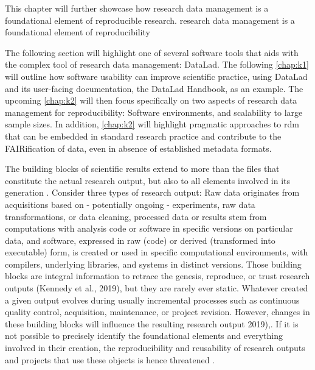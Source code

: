 This chapter will further showcase how research data management is a foundational element of reproducible research.
research data management is a foundational element of reproducibility \citep{borghi2021promoting}


The following section will  highlight one of several software tools that aids with the complex tool of research data management: DataLad. The following \cref{chap:k1} will outline how software usability can improve scientific practice, using DataLad and its user-facing documentation, the DataLad Handbook, as an example.
The upcoming \cref{chap:k2} will then focus specifically on two aspects of research data management for reproducibility: Software environments, and scalability to large sample sizes.
In addition, \cref{chap:k2} will highlight pragmatic approaches to \gls{rdm} that can be embedded in standard research practice and contribute to the FAIRification of data, even in absence of established metadata formats.






The building blocks of scientific results extend to more than the files that constitute the actual research output, but also to all elements involved in its generation \citep{claerbout1992electronic}.
Consider three types of research output: Raw data originates from acquisitions based on - potentially ongoing - experiments, raw data transformations, or data cleaning, processed data or results stem from computations with analysis code or software in specific versions on particular data, and software, expressed in raw (code) or derived (transformed into executable) form, is created or used in specific computational environments, with compilers, underlying libraries, and systems in distinct versions.
Those building blocks are integral information to retrace the genesis, reproduce, or trust research outputs (Kennedy et al., 2019), but they are rarely ever static.
Whatever created a given output evolves during usually incremental processes such as continuous quality control, acquisition, maintenance, or project revision.
However, changes in these building blocks will influence the resulting research output \citep{kennedy2019everything} 2019),\citep{glatard2015reproducibility}.
If it is not possible to precisely identify the foundational elements and everything involved in their creation, the reproducibility and reusability of research outputs and projects that use these objects is hence threatened \citep{kennedy2019everything}.

